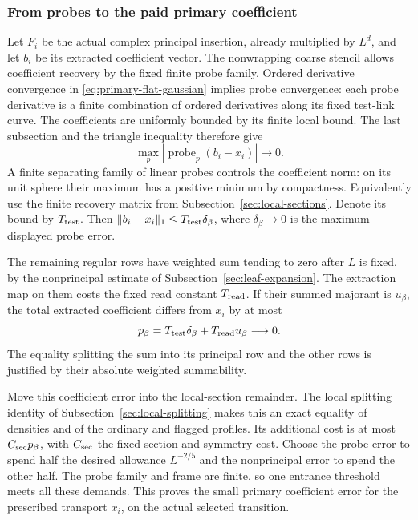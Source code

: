 \subsubsection{From probes to the paid primary coefficient}
Let $F_i$ be the actual complex principal insertion, already multiplied
by $L^d$, and let $b_i$ be its extracted coefficient vector. The
nonwrapping coarse stencil allows coefficient recovery by the fixed
finite probe family. Ordered derivative convergence in
\eqref{eq:primary-flat-gaussian} implies probe convergence: each
probe derivative is a finite combination of ordered derivatives
along its fixed test-link curve. The coefficients are uniformly
bounded by its finite local bound. The last subsection and the
triangle inequality therefore give
\[
       \max_p|\operatorname{probe}_p(b_i-x_i)|\longrightarrow0.
\]
A finite separating family of linear probes controls the coefficient
norm: on its unit sphere their maximum has a positive minimum by
compactness. Equivalently use the finite recovery matrix from
Subsection~\ref{sec:local-sections}. Denote its bound by $T_{\rm test}$.
Then $\|b_i-x_i\|_1\le T_{\rm test}\delta_\beta$, where
$\delta_\beta\to0$ is the maximum displayed probe error.

The remaining regular rows have weighted sum tending to zero after
$L$ is fixed, by the nonprincipal estimate of
Subsection~\ref{sec:leaf-expansion}. The extraction map on them costs
the fixed read constant $T_{\rm read}$. If their summed majorant is
$u_\beta$, the total extracted coefficient differs from $x_i$ by at most
\[
                    p_\beta=T_{\rm test}\delta_\beta
                                  +T_{\rm read}u_\beta\longrightarrow0.
\]
The equality splitting the sum into its principal row and the other
rows is justified by their absolute weighted summability.

Move this coefficient error into the local-section remainder. The
local splitting identity of Subsection~\ref{sec:local-splitting} makes
this an exact equality of densities and of the ordinary and flagged
profiles. Its additional cost is at most $C_{\rm sec}p_\beta$, with
$C_{\rm sec}$ the fixed section and symmetry cost. Choose the probe
error to spend half the desired allowance $L^{-2/5}$ and the
nonprincipal error to spend the other half. The probe family and
frame are finite, so one entrance threshold meets all these demands.
This proves the small primary coefficient error for the prescribed
transport $x_i$, on the actual selected transition.

